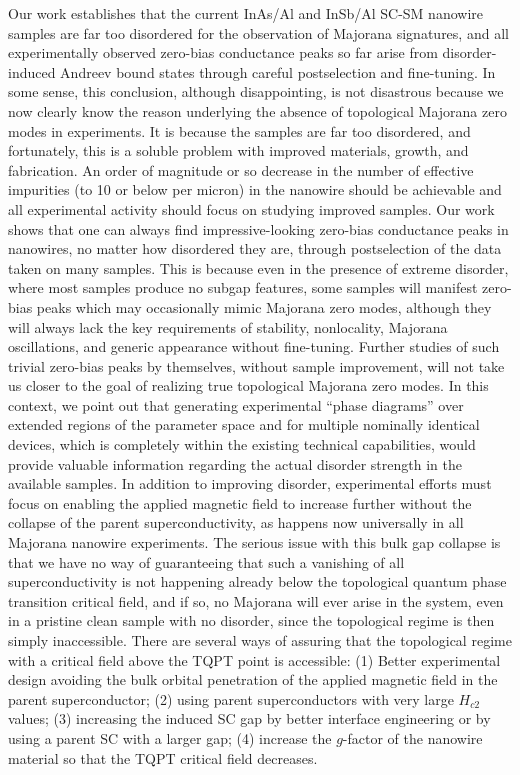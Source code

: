 \documentclass[aps,prmaterials,twocolumn,superscriptaddress,longbibliography]{revtex4-2}
\begin{document}
Our work establishes that the current InAs/Al and InSb/Al SC-SM nanowire samples are far too disordered for the observation of Majorana signatures, and all experimentally observed zero-bias conductance peaks so far arise from disorder-induced Andreev bound states through careful postselection and fine-tuning.  In some sense, this conclusion, although disappointing,  is not disastrous because we now clearly know the reason underlying the absence of topological Majorana zero modes in experiments. It is because the samples are far too disordered, and fortunately, this is a soluble problem with improved materials, growth, and fabrication. An order of magnitude or so decrease in the number of effective impurities (to 10 or below per micron) in the nanowire should be achievable and all experimental activity should focus on studying improved samples. Our work shows that one can always find impressive-looking zero-bias conductance peaks in nanowires, no matter how disordered they are, through postselection of the data taken on many samples. This is because even in the presence of extreme disorder, where most samples produce no subgap features, some samples will manifest zero-bias peaks which may occasionally mimic Majorana zero modes, although they will always lack the key requirements of stability, nonlocality, Majorana oscillations, and generic appearance without fine-tuning.  Further studies of such trivial zero-bias peaks by themselves, without sample improvement, will not take us closer to the goal of realizing true topological Majorana zero modes.  In this context, we point out that generating experimental ``phase diagrams'' over extended regions of the parameter space and for multiple nominally identical devices, which is completely within the existing technical capabilities, would provide valuable information regarding the actual disorder strength in the available samples.
In addition to improving disorder, experimental efforts must focus on enabling the applied magnetic field to increase further without the collapse of the parent superconductivity, as happens now universally in all Majorana nanowire experiments.  The serious issue with this bulk gap collapse is that we have no way of guaranteeing that such a vanishing of all superconductivity is not happening already below the topological quantum phase transition critical field, and if so, no Majorana will ever arise in the system, even in a pristine clean sample with no disorder,  since the topological regime is then simply inaccessible.  There are several ways of assuring that the topological regime with a critical field above the TQPT point is accessible: (1) Better experimental design avoiding the bulk orbital penetration of the applied magnetic field in the parent superconductor; (2) using parent superconductors with very large $ H_{c2} $ values; (3) increasing the induced SC gap by better interface engineering or by using a parent SC with a larger gap; (4) increase the $ g $-factor of the nanowire material so that the TQPT critical field decreases.
\end{document}
